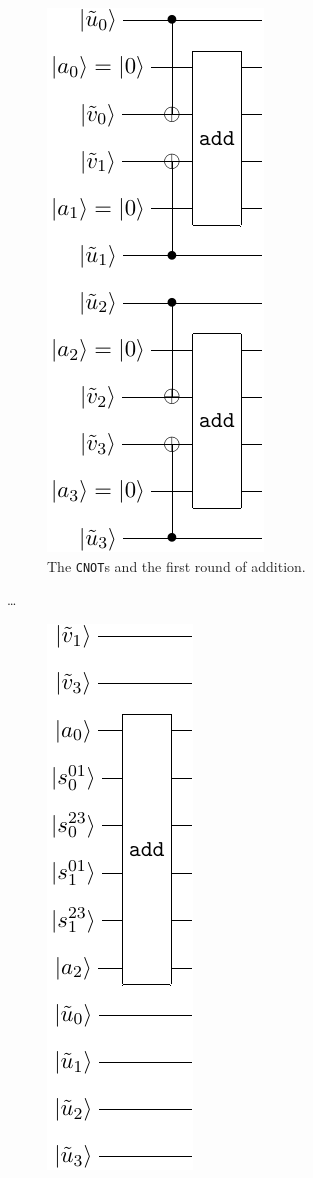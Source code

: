 \documentclass[notitlepage]{report}
\theoremstyle{definition}
\begin{document}
\begin{figure}
    \begin{subfigure}{.3\textwidth}
        \centering
        \includegraphics{popcnt_sieve_pt1}
        \caption{The \texttt{CNOT}s and the first round of addition.}\label{subfig:naive_popcnt1}
    \end{subfigure}
    \dots
    \begin{subfigure}{.3\textwidth}
        \centering
        \includegraphics{popcnt_sieve_pt2}

\end{subfigure}
\end{figure}
\end{document}
